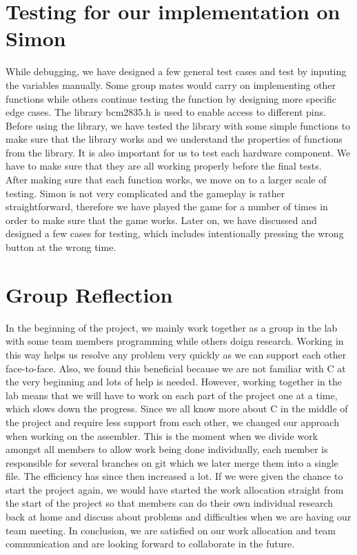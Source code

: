 \documentclass[11pt]{article}
\begin{document}
\section{Testing for our implementation on Simon}
While debugging, we have designed a few general test cases and test by inputing the variables manually. Some group mates would carry on implementing other functions while others continue testing the function by designing more specific edge cases.
The library bcm2835.h is used to enable access to different pins. Before using the library, we have tested the library with some simple functions to make sure that the library works and we understand the properties of functions from the library.
It is also important for us to test each hardware component. We have to make sure that they are all working properly before the final tests. \\After making sure that each function works, we move on to a larger scale of testing. Simon is not very complicated and the gameplay is rather straightforward, therefore we have played the game for a number of times in order to make sure that the game works.\newline 
Later on, we have discussed and designed a few cases for testing, which includes intentionally pressing the wrong button at the wrong time. 


\section{Group Reflection}
In the beginning of the project, we mainly work together as a group in the lab with some team members programming while others doign research. Working in this way helps us resolve any problem very quickly as we can support each other face-to-face. Also, we found this beneficial because we are not familiar with C at the very beginning and lots of help is needed. However, working together in the lab means that we will have to work on each part of the project one at a time, which slows down the progress. Since we all know more about C in the middle of the project and require less support from each other, we changed our approach when working on the assembler. This is the moment when we divide work amongst all members to allow work being done individually, each member is responsible for several branches on git which we later merge them into a single file. The efficiency has since then increased a lot. If we were given the chance to start the project again, we would have started the work allocation straight from the start of the project so that members can do their own individual research back at home and discuss about problems and difficulties when we are having our team meeting. In conclusion, we are satisfied on our work allocation and team communication and are looking forward to collaborate in the future.
\end{document}
